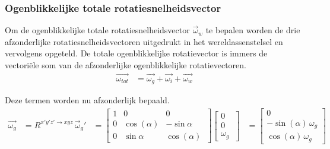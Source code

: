 \subsubsection{Ogenblikkelijke totale rotatiesnelheidsvector}
Om de ogenblikkelijke totale rotatiesnelheidsvector $\overrightarrow{\omega}_{w}$ te bepalen worden de drie afzonderlijke rotatiesnelheidsvectoren uitgedrukt in het wereldassenstelsel en vervolgens opgeteld. De totale ogenblikkelijke rotatievector is immers de vectori\"ele som van de afzonderlijke ogenblikkelijke rotatievectoren.\\
\begin{equation*}
\begin{split}
\overrightarrow{\omega_{tot}}
&=\overrightarrow{\omega_{g}}+\overrightarrow{\omega_{i}}+\overrightarrow{\omega_{w}}
\end{split}
\end{equation*}



Deze termen worden nu afzonderlijk bepaald.
\begin{equation*}
\begin{split}
\overrightarrow{\omega_{g}}
&=R^{x'y'z' \rightarrow xyz}\,\overrightarrow{\omega}_{g}'
&=	  \begin{bmatrix}
      1 & 0 & 0\\
      0 & \cos(\alpha) & -\sin{\alpha}\\ 
      0 & \sin{\alpha} & \cos(\alpha)\
      \end{bmatrix}
      \begin{bmatrix}
      0\\
      0\\
      \omega_{g}\
      \end{bmatrix}     
&=	  \begin{bmatrix}
      0\\
      -\sin(\alpha)\,\omega_{g}\\
      \cos(\alpha)\,\omega_{g}\
      \end{bmatrix}
\end{split}
\end{equation*}

